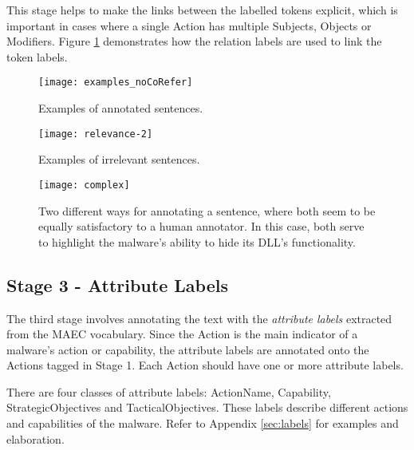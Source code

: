 \documentclass[11pt,a4paper]{article}
\begin{document}
This stage helps to make the links between the labelled tokens explicit, which is important in cases where a single Action has multiple Subjects, Objects or Modifiers. Figure \ref{sample-1} demonstrates how the relation labels are used to link the token labels.

\begin{figure}[t]
\centering
\texttt{[image: examples\_noCoRefer]}

\vspace{-1mm}

\caption{\label{sample-1}Examples of annotated sentences.}
\vspace{-1em}
\end{figure}

\begin{figure}[t]
\vspace{4mm}
\centering
\texttt{[image: relevance-2]}

\vspace{-3mm}

\caption{\label{irrelevant}Examples of irrelevant sentences.}
\end{figure}

\begin{figure*}[t]
\centering
\texttt{[image: complex]}
\vspace{-2mm}
\caption{\label{complex}
Two different ways for annotating a sentence, where both seem to be equally satisfactory to a human annotator. In this case, both serve to highlight the malware's ability to hide its DLL's functionality. 
}
\end{figure*}


\subsection{Stage 3 - Attribute Labels}
\label{app:ann:stage3}

The third stage involves annotating the text with the \emph{attribute labels} extracted from the MAEC vocabulary. Since the Action is the main indicator of a malware's action or capability, the attribute labels are annotated onto the Actions tagged in Stage 1. Each Action should have one or more attribute labels.

There are four classes of attribute labels: ActionName, Capability, StrategicObjectives and TacticalObjectives. These labels describe different actions and capabilities of the malware. Refer to Appendix \ref{sec:labels} for examples and elaboration.
\end{document}
